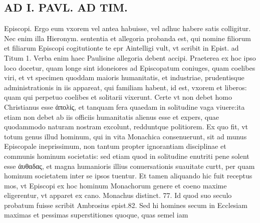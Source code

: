 \documentclass{article}
\begin{document}
\begin{pages}
\section*{AD I. PAVL. AD TIM. }
\marginpar{[ p.142 ]}\pstart Episcopi. Ergo eum vxorem vel antea habuisse, vel adhuc habere satis colligitur. Nec enim illa Hieronym. sententia et allegoria probanda est, qui nomine filiorum et filiarum Episcopi cogitutionte te epr Aintelligi vult, vt scribit in Epist. ad Titum 1. Verba enim haec Paulisine allegoria debent accipi.  \pend\pstart Praeterea ex hoc ipso loco docetur, quam longe sint idoneiores ad Episcopatum coniuges, quam coelibes viri, et vt specimen quoddam maioris humanitatis, et industriae, prudentisque administrationis in iis appareat, qui familiam habent, id est, vxorem et liberos: quam qui perpetuo coelibes et solitarii vixerunt. Certe vt non debet homo Christianus esse ἀπολίς, et tanquam fera quaedam in solitudine vaga viuere:ita etiam non debet ab iis officiis humanitatis alienus esse et expers, quae quodammodo naturam nostram excolunt, redduntque  politiorem. Ex quo fit, vt totum genus illud hominum, qui in vita Monachica consenuerunt, sit ad munus Episcopale ineprissimum, non tantum propter ignorantiam disciplinae et communis hominum societatis: sed etiam quod in solitudine enutriti pene solent esse ἀυθαδας, et magna humanioris illius conuersationis suauitate curtt, per quam hominum societatem inter se ipsos tuentur. Et tamen aliquando hic fuit receptus mos, vt Episcopi ex hoc hominum Monachorum genere et coeno maxime eligerentur, vt apparet ex cano. Monachus distinct. 77. Id quod suo seculo probatum fuisse scribit Ambrosius epist.82. Sed hi homines secum in Ecclesiam maximas et pessimas superstitiones quoque, quas semel iam  \pend

\end{pages}
\end{document}

